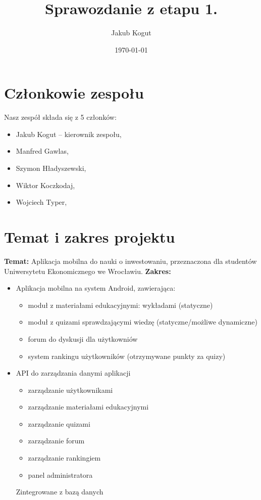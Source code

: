 \documentclass[11pt,a4paper]{article}
\title{Sprawozdanie z etapu 1.}
\author{Jakub Kogut}
\date{\today}
\theoremstyle{polski}
\theoremstyle{polski-def}
\numberwithin{equation}{section}
\begin{document}
\maketitle
\section{Członkowie zespołu}
Nasz zespół składa się z 5 członków:
\begin{itemize}
    \item Jakub Kogut -- kierownik zespołu,
    \item Manfred Gawlas,
    \item Szymon Hładyszewski,
    \item Wiktor Koczkodaj,
    \item Wojciech Typer,
\end{itemize}

\section{Temat i zakres projektu}
\textbf{Temat:} Aplikacja mobilna do nauki o inwestowaniu, przeznaczona dla studentów Uniwersytetu Ekonomicznego we Wrocławiu. \newline
\textbf{Zakres:}
\begin{itemize}
    \item Aplikacja mobilna na system Android, zawierająca:
        \begin{itemize}
            \item moduł z materiałami edukacyjnymi: wykładami (statyczne)
            \item moduł z quizami sprawdzającymi wiedzę (statyczne/możliwe dynamiczne)
            \item forum do dyskusji dla użytkowniów
            \item system rankingu użytkowników (otrzymywane punkty za quizy)
        \end{itemize}
    \item API do zarządzania danymi aplikacji
        \begin{itemize}
            \item zarządzanie użytkownikami
            \item zarządzanie materiałami edukacyjnymi
            \item zarządzanie quizami
            \item zarządzanie forum
            \item zarządzanie rankingiem
            \item panel administratora
        \end{itemize}
        Zintegrowane z bazą danych
\end{itemize}
\end{document}
